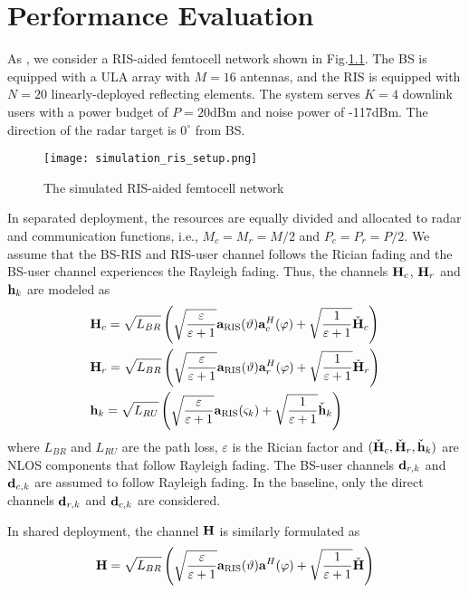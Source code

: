 \chapter{Performance Evaluation}\label{cha:performance-evaluation}

As \cite{guo2020ris}, we consider a RIS-aided femtocell network shown in Fig.\ref{fig:simulation_ris_setup}. The BS is equipped with a ULA array with $M=16$ antennas, and the RIS is equipped with
$N=20$ linearly-deployed reflecting elements. The system serves $K=4$ downlink users with a power budget of
$P=20$dBm and noise power of -117dBm. The direction of the radar target is $0^\circ$ from BS. 

\begin{figure}[htb]
  \centering
  \texttt{[image: simulation\_ris\_setup.png]}
  \caption{The simulated RIS-aided femtocell network}
  \label{fig:simulation_ris_setup}
\end{figure}

In separated deployment, the resources are equally divided and allocated to radar and communication functions, 
i.e., $M_c=M_r=M/2$ and $P_c=P_r=P/2$. We assume that the BS-RIS and RIS-user channel 
follows the Rician fading and the BS-user channel experiences the Rayleigh fading. Thus, the channels
${\bf H}_c$, ${\bf H}_r$ and ${\bf h}_k$ are modeled as 
\begin{align}
    &{\bf H}_c = \sqrt{L_{BR}} \left( \sqrt{\frac{\varepsilon}{\varepsilon+1}} {\bf a}_{\mathrm{RIS}}(\vartheta) {\bf a}_c^H(\varphi) + \sqrt{\frac{1}{\varepsilon+1}} \check{\bf H}_c \right) \\
    &{\bf H}_r = \sqrt{L_{BR}} \left( \sqrt{\frac{\varepsilon}{\varepsilon+1}} {\bf a}_{\mathrm{RIS}}(\vartheta) {\bf a}_r^H(\varphi) + \sqrt{\frac{1}{\varepsilon+1}} \check{\bf H}_r \right) \\
    &{\bf h}_k = \sqrt{L_{RU}} \left( \sqrt{\frac{\varepsilon}{\varepsilon+1}} {\bf a}_{\mathrm{RIS}}(\varsigma_k) + \sqrt{\frac{1}{\varepsilon+1}} \check{\bf h}_k \right)
\end{align}
where $L_{BR}$ and $L_{RU}$ are the path loss, $\varepsilon$ is the Rician factor and $(\check{\bf H}_c, \check{\bf H}_r, \check{\bf h}_k)$
are NLOS components that follow Rayleigh fading. The BS-user channels ${\bf d}_{r,k}$ and ${\bf d}_{c,k}$ are assumed to 
follow Rayleigh fading. In the baseline, only the direct channels ${\bf d}_{r,k}$ and ${\bf d}_{c,k}$ are considered. 

In shared deployment, the channel ${\bf H}$ is similarly formulated as
\begin{equation}
    {\bf H} = \sqrt{L_{BR}} \left( \sqrt{\frac{\varepsilon}{\varepsilon+1}} {\bf a}_{\mathrm{RIS}}(\vartheta) {\bf a}^H(\varphi) + \sqrt{\frac{1}{\varepsilon+1}} \check{\bf H} \right)
\end{equation}

